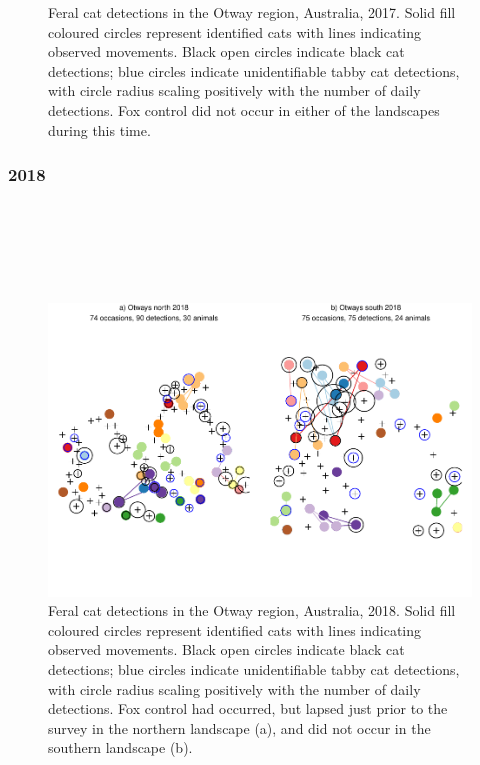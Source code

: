 \documentclass[11pt,a4paper,titlepage,twoside,openright]{style/unimelbthesis}
\begin{document}
\begin{mainmatter}
\begin{figure}
{}

\caption{Feral cat detections in the Otway region, Australia, 2017. Solid fill coloured circles represent identified cats with lines indicating observed movements. Black open circles indicate black cat detections; blue circles indicate unidentifiable tabby cat detections, with circle radius scaling positively with the number of daily detections. Fox control did not occur in either of the landscapes during this time.}\label{fig:density-plot-ch-4}
\end{figure}
\newpage

\hypertarget{section-1}{%
\subsubsection{2018}\label{section-1}}

\(~\)

\(~\)

\(~\)
\begin{figure}

{\centering \includegraphics[width=1\linewidth]{figure/density-plot-ch-5-1} 

}

\caption{Feral cat detections in the Otway region, Australia, 2018. Solid fill coloured circles represent identified cats with lines indicating observed movements. Black open circles indicate black cat detections; blue circles indicate unidentifiable tabby cat detections, with circle radius scaling positively with the number of daily detections. Fox control had occurred, but lapsed just prior to the survey in the northern landscape (a), and did not occur in the southern landscape (b).}\label{fig:density-plot-ch-5}
\end{figure}
\newpage


\end{mainmatter}
\end{document}
